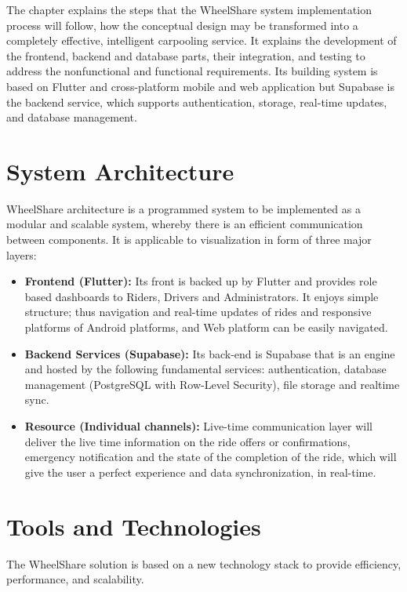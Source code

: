 The chapter explains the steps that the WheelShare system implementation process will follow, how the conceptual design may be transformed into a completely effective, intelligent carpooling service. It explains the development of the frontend, backend and database parts, their integration, and testing to address the nonfunctional and functional requirements. Its building system is based on Flutter and cross-platform mobile and web application but Supabase is the backend service, which supports authentication, storage, real-time updates, and database management. 

\section{System Architecture}
WheelShare architecture is a programmed system to be implemented as a modular and scalable system, whereby there is an efficient communication between components. It is applicable to visualization in form of three major layers:  
\begin{itemize}
    \item \textbf{Frontend (Flutter):} Its front is backed up by Flutter and provides role based dashboards to Riders, Drivers and Administrators. It enjoys simple structure; thus navigation and real-time updates of rides and responsive platforms of Android platforms, and Web platform can be easily navigated.

    \item \textbf{Backend Services (Supabase):} Its back-end is Supabase that is an engine and hosted by the following fundamental services: authentication, database management (PostgreSQL with Row-Level Security), file storage and realtime sync.  
 
    \item \textbf{Resource (Individual channels):} Live-time communication layer will deliver the live time information on the ride offers or confirmations, emergency notification and the state of the completion of the ride, which will give the user a perfect experience and data synchronization, in real-time. 
 
\end{itemize}

\section{Tools and Technologies}
The WheelShare solution is based on a new technology stack to provide efficiency, performance, and scalability. 

